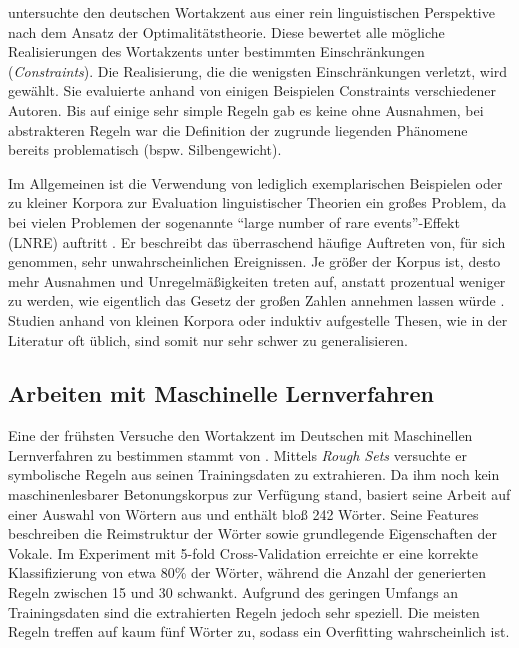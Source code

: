 \cite{Fery1998} untersuchte den deutschen Wortakzent aus einer rein linguistischen Perspektive nach dem Ansatz der Optimalitätstheorie. Diese bewertet alle mögliche Realisierungen des Wortakzents unter bestimmten Einschränkungen (\textit{Constraints}). Die Realisierung, die die wenigsten Einschränkungen verletzt, wird gewählt.
Sie evaluierte anhand von einigen Beispielen Constraints verschiedener Autoren. Bis auf einige sehr simple Regeln gab es keine ohne Ausnahmen, bei abstrakteren Regeln war die Definition der zugrunde liegenden Phänomene bereits problematisch (bspw. Silbengewicht).

Im Allgemeinen ist die Verwendung von lediglich exemplarischen Beispielen oder zu kleiner Korpora zur Evaluation linguistischer Theorien ein großes Problem, da bei vielen Problemen der sogenannte \enquote{large number of rare events}-Effekt (LNRE) auftritt \cite{Kvizhinadze2010}. Er beschreibt das überraschend häufige Auftreten von, für sich genommen, sehr unwahrscheinlichen Ereignissen. Je größer der Korpus ist, desto mehr Ausnahmen und Unregelmäßigkeiten treten auf, anstatt prozentual weniger zu werden, wie eigentlich das Gesetz der großen Zahlen annehmen lassen würde \cite[S.~69]{Demberg2006}. Studien anhand von kleinen Korpora oder induktiv aufgestelle Thesen, wie in der Literatur oft üblich, sind somit nur sehr schwer zu generalisieren. \label{LNRE}

\subsection{Arbeiten mit Maschinelle Lernverfahren}

Eine der frühsten Versuche den Wortakzent im Deutschen mit Maschinellen Lernverfahren zu bestimmen stammt von \cite{Rapp1995}. Mittels \textit{Rough Sets} versuchte er symbolische Regeln aus seinen Trainingsdaten zu extrahieren. Da ihm noch kein maschinenlesbarer Betonungskorpus zur Verfügung stand, basiert seine Arbeit auf einer Auswahl von Wörtern aus \cite{Giegerich1985} und enthält bloß 242 Wörter. Seine Features beschreiben die Reimstruktur der Wörter sowie grundlegende Eigenschaften der Vokale. Im Experiment mit 5-fold Cross-Validation erreichte er eine korrekte Klassifizierung von etwa 80\% der Wörter, während die Anzahl der generierten Regeln zwischen 15 und 30 schwankt. Aufgrund des geringen Umfangs an Trainingsdaten sind die extrahierten Regeln jedoch sehr speziell. Die meisten Regeln treffen auf kaum fünf Wörter zu, sodass ein Overfitting wahrscheinlich ist.


